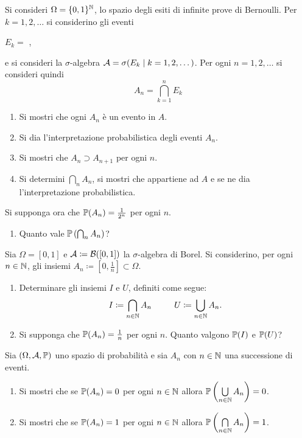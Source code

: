 \Esercizio{}

Si consideri $\Omega =\{0,1\}^{\mathbb{N}}$, lo spazio degli esiti di infinite prove di Bernoulli. Per $k=1,2,\dots $ si considerino gli eventi
\begin{center}
	$E_{k} =$ ,
\end{center}
e si consideri la $\sigma $-algebra $\mathcal{A} =\sigma (E_{k} \mid k=1,2,\dots)$. Per ogni $n=1,2,\dots $ si consideri quindi
\begin{equation*}
	A_{n} =\bigcap_{k=1}^{n} E_{k}
\end{equation*}
\begin{enumerate}
	\item Si mostri che ogni $A_{n}$ è un evento in $A$.
	\item Si dia l'interpretazione probabilistica degli eventi $A_{n}$.
	\item Si mostri che $A_{n} \supset A_{n+1}$ per ogni $n$.
	\item Si determini $\bigcap_{n} A_{n}$, si mostri che appartiene ad $A$ e se ne dia l'interpretazione probabilistica.
\end{enumerate}
Si supponga ora che $\mathbb{P}(A_{n}) =\frac{1}{2^{n}}$ per ogni $n$.
\begin{enumerate}[resume]
	\item Quanto vale $\mathbb{P}\left(\bigcap_{n} A_{n}\right)$?
\end{enumerate}

\Esercizio{}

Sia $\Omega =[0,1]$ e $\mathcal{A} \coloneqq \mathcal{B}([0,1])$ la $\sigma $-algebra di Borel. Si considerino, per ogni $n\in \mathbb{N}$, gli insiemi $A_{n} \coloneqq \left[0,\frac{1}{n}\right] \subset \Omega $.
\begin{enumerate}
	\item Determinare gli insiemi $I$ e $U$, definiti come segue:
	\begin{equation*}
		I\coloneqq \bigcap_{n\in \mathbb{N}} A_{n} \ \ \ \ \ \ \ \ U\coloneqq \bigcup_{n\in \mathbb{N}} A_{n} .
	\end{equation*}
	\item Si supponga che $\mathbb{P}(A_{n}) =\frac{1}{n}$ per ogni $n$. Quanto valgono $\mathbb{P}(I)$ e $\mathbb{P}(U)$?
\end{enumerate}

\Esercizio{$\star$}

Sia $(\Omega,\mathcal{A},\mathbb{P})$ uno spazio di probabilità e sia $A_{n}$ con $n\in \mathbb{N}$ una successione di eventi.
\begin{enumerate}
	\item Si mostri che se $\mathbb{P}(A_{n}) =0$ per ogni $n\in \mathbb{N}$ allora $\mathbb{P}\left(\bigcup\limits_{n\in \mathbb{N}} A_{n}\right) =0$.
	\item Si mostri che se $\mathbb{P}(A_{n}) =1$ per ogni $n\in \mathbb{N}$ allora $\mathbb{P}\left(\bigcap\limits_{n\in \mathbb{N}} A_{n}\right) =1$.
\end{enumerate}

